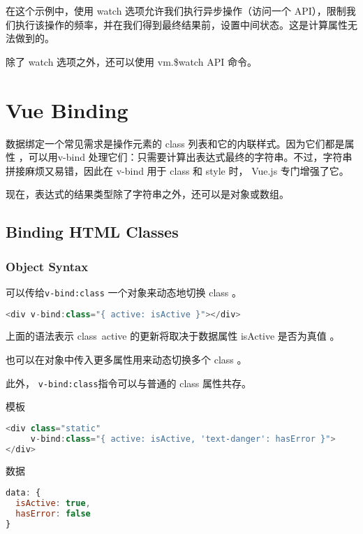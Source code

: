 在这个示例中，使用 watch 选项允许我们执行异步操作（访问一个 API），限制我们执行该操作的频率，并在我们得到最终结果前，设置中间状态。这是计算属性无法做到的。

除了 watch 选项之外，还可以使用 vm.\$watch API 命令。


\chapter{Vue Binding}


数据绑定一个常见需求是操作元素的 class 列表和它的内联样式。因为它们都是属性 ，可以用v-bind 处理它们：只需要计算出表达式最终的字符串。不过，字符串拼接麻烦又易错，因此在 v-bind 用于 class 和 style 时， Vue.js 专门增强了它。



现在，表达式的结果类型除了字符串之外，还可以是对象或数组。


\section{Binding HTML Classes}



\subsection{Object Syntax}

可以传给\texttt{v-bind:class} 一个对象来动态地切换 class 。

\begin{lstlisting}[language=JavaScript]
<div v-bind:class="{ active: isActive }"></div>
\end{lstlisting}

上面的语法表示 class~active 的更新将取决于数据属性 isActive 是否为真值 。

也可以在对象中传入更多属性用来动态切换多个 class 。

此外， \texttt{v-bind:class}指令可以与普通的 class 属性共存。

\begin{compactitem}
\item 模板

\begin{lstlisting}[language=JavaScript]
<div class="static"
     v-bind:class="{ active: isActive, 'text-danger': hasError }">
</div>
\end{lstlisting}

\item 数据

\begin{lstlisting}[language=JavaScript]
data: {
  isActive: true,
  hasError: false
}
\end{lstlisting}
\end{compactitem}



